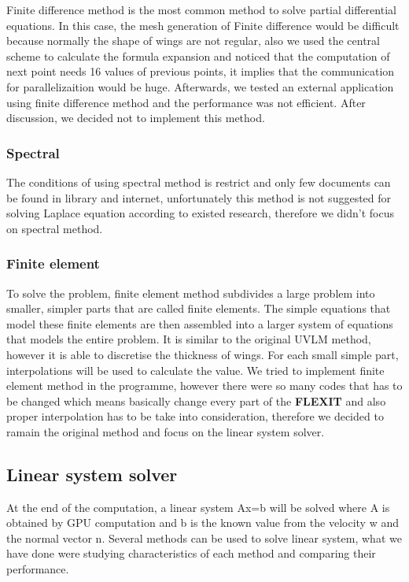 \documentclass[a4paper, 11pt, article]{report}
\begin{document}
Finite difference method is the most common method to solve partial differential equations. In this case, the mesh generation of Finite difference would be difficult because normally the shape of wings are not regular, also we used the central scheme to calculate the formula expansion and noticed that the computation of next point needs 16 values of previous points, it implies that the communication for parallelizaition would be huge. Afterwards, we tested an external application using finite difference method and the performance was not efficient. After discussion, we decided not to implement this method.

\subsubsection{Spectral} 

The conditions of using spectral method is restrict and only few documents can be found in library and internet, unfortunately this method is not suggested for solving Laplace equation according to existed research, therefore we didn't focus on spectral method.

\subsubsection{Finite element}

To solve the problem, finite element method subdivides a large problem into smaller, simpler parts that are called finite elements. The simple equations that model these finite elements are then assembled into a larger system of equations that models the entire problem. It is similar to the original UVLM method, however it is able to discretise the thickness of wings. For each small simple part, interpolations will be used to calculate the value. We tried to implement finite element method in the programme, however there were so many codes that has to be changed which means basically change every part of the \textbf{FLEXIT} and also proper interpolation has to be take into consideration, therefore we decided to ramain the original method and focus on the linear system solver.

\subsection{Linear system solver}

At the end of the computation, a linear system Ax=b will be solved where A is obtained by GPU computation and b is the known value from the velocity w and the normal vector n. Several methods can be used to solve linear system, what we have done were studying characteristics of each method and comparing their performance.
\end{document}

